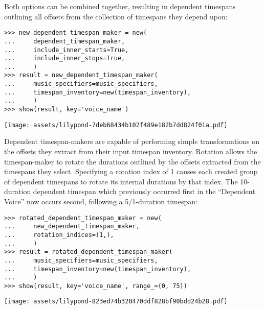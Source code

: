 \noindent Both options can be combined together, resulting in dependent
timespans outlining all offsets from the collection of timespans they depend
upon:

\begin{comment}
<abjad>
new_dependent_timespan_maker = new(
    dependent_timespan_maker,
    include_inner_starts=True,
    include_inner_stops=True,
    )
result = new_dependent_timespan_maker(
    music_specifiers=music_specifiers,
    timespan_inventory=new(timespan_inventory),
    )
show(result, key='voice_name')
</abjad>
\end{comment}

\begin{singlespacing}
\vspace{-0.5\baselineskip}
\begin{lstlisting}
>>> new_dependent_timespan_maker = new(
...     dependent_timespan_maker,
...     include_inner_starts=True,
...     include_inner_stops=True,
...     )
>>> result = new_dependent_timespan_maker(
...     music_specifiers=music_specifiers,
...     timespan_inventory=new(timespan_inventory),
...     )
>>> show(result, key='voice_name')
\end{lstlisting}
\noindent\texttt{[image: assets/lilypond-7deb68434b102f489e182b7dd824f01a.pdf]}
\end{singlespacing}

\noindent Dependent timespan-makers are capable of performing simple
transformations on the offsets they extract from their input timespan
inventory. Rotation allows the timespan-maker to rotate the durations outlined
by the offsets extracted from the timespans they select. Specifying a rotation
index of 1 causes each created group of dependent timespans to rotate its
internal durations by that index. The 10-duration dependent timespan which
previously occurred first in the \enquote{Dependent Voice} now occurs second,
following a 5/1-duration timespan:

\begin{comment}
<abjad>
rotated_dependent_timespan_maker = new(
    new_dependent_timespan_maker,
    rotation_indices=(1,),
    )
result = rotated_dependent_timespan_maker(
    music_specifiers=music_specifiers,
    timespan_inventory=new(timespan_inventory),
    )
show(result, key='voice_name', range_=(0, 75))
</abjad>
\end{comment}

\begin{singlespacing}
\vspace{-0.5\baselineskip}
\begin{lstlisting}
>>> rotated_dependent_timespan_maker = new(
...     new_dependent_timespan_maker,
...     rotation_indices=(1,),
...     )
>>> result = rotated_dependent_timespan_maker(
...     music_specifiers=music_specifiers,
...     timespan_inventory=new(timespan_inventory),
...     )
>>> show(result, key='voice_name', range_=(0, 75))
\end{lstlisting}
\noindent\texttt{[image: assets/lilypond-823ed74b320470ddf828bf90bdd24b28.pdf]}
\end{singlespacing}

